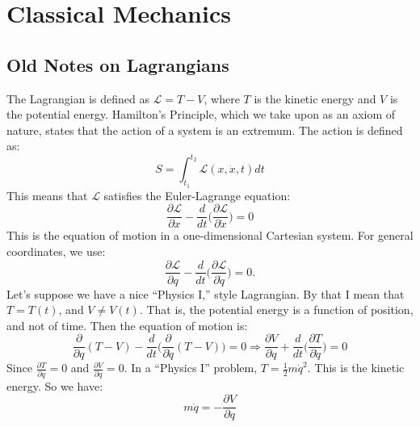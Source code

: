 \documentclass[crop=false,class=article,oneside]{standalone}
\begin{document}
    \ifx\ifemagi\undefined
        \section*{Classical Mechanics}
        \setcounter{section}{2}
    \fi
    \subsection{Old Notes on Lagrangians}
    The Lagrangian is defined as $\mathcal{L}=T-V$,
    where $T$ is the kinetic energy and $V$ is the
    potential energy. Hamilton's Principle,
    which we take upon as an axiom of nature,
    states that the action of a system is an extremum.
    The action is defined as:
    \begin{equation*}
        S=\int_{t_1}^{t_2}\mathcal{L}(x,\dot{x},t)dt
    \end{equation*}This means that $\mathcal{L}$
    satisfies the Euler-Lagrange equation:
    \begin{equation*} 
        \frac{\partial \mathcal{L}}{\partial{x}}
        -
        \frac{d}{dt}\big(
            \frac{\partial\mathcal{L}}{\partial\dot{x}}
        \big)
        =0
    \end{equation*}
    This is the equation of motion in a one-dimensional
    Cartesian system. For general coordinates, we use:
    \begin{equation*}
        \frac{\partial\mathcal{L}}{\partial q}
        -\frac{d}{dt}\big(
            \frac{\partial\mathcal{L}}{\partial\dot{q}}
        \big)
        =0.
    \end{equation*}
    Let's suppose we have a nice ``Physics I,'' style Lagrangian.
    By that I mean that $T = T(t)$, and $V \ne V(t)$.
    That is, the potential energy is a function of position,
    and not of time. Then the equation of motion is:
    \begin{equation*}
        \frac{\partial}{\partial q}(T-V)-\frac{d}{dt}
        \big(\frac{\partial}{\partial\dot{q}}(T-V)\big)=0
        \Rightarrow
        \frac{\partial{V}}{\partial{q}}
        +\frac{d}{dt}\big(
            \frac{\partial{T}}{\partial\dot{q}}
        \big)
        =0
    \end{equation*}
    Since $\frac{\partial{T}}{\partial{q}}=0$
    and $\frac{\partial{V}}{\partial\dot{q}}=0$.
    In a ``Physics I'' problem, $T=\frac{1}{2}m\dot{q}^2$.
    This is the kinetic energy. So we have:
    \begin{equation}
    \nonumber m\ddot{q} = -\frac{\partial V}{\partial q}
    \end{equation}
\end{document}
